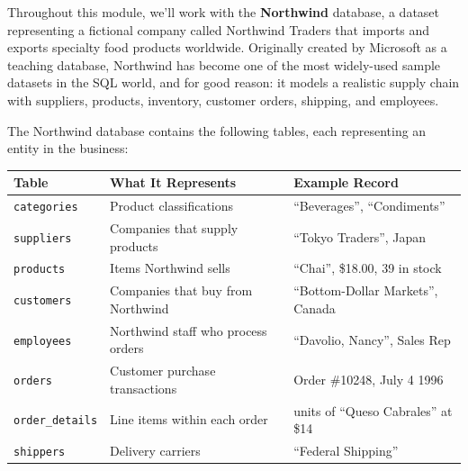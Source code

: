 \documentclass[
  letterpaper,
  DIV=11,
  numbers=noendperiod]{scrreprt}
\begin{document}
Throughout this module, we'll work with the \textbf{Northwind} database,
a dataset representing a fictional company called Northwind Traders that
imports and exports specialty food products worldwide. Originally
created by Microsoft as a teaching database, Northwind has become one of
the most widely-used sample datasets in the SQL world, and for good
reason: it models a realistic supply chain with suppliers, products,
inventory, customer orders, shipping, and employees.

The Northwind database contains the following tables, each representing
an entity in the business:

\begin{longtable}[]{@{}
  >{\raggedright\arraybackslash}p{}
  >{\raggedright\arraybackslash}p{}
  >{\raggedright\arraybackslash}p{}@{}}
\toprule\noalign{}
\begin{minipage}[b]{\linewidth}\raggedright
Table
\end{minipage} & \begin{minipage}[b]{\linewidth}\raggedright
What It Represents
\end{minipage} & \begin{minipage}[b]{\linewidth}\raggedright
Example Record
\end{minipage} \\
\midrule\noalign{}
\endhead
\bottomrule\noalign{}
\endlastfoot
\texttt{categories} & Product classifications & ``Beverages'',
``Condiments'' \\
\texttt{suppliers} & Companies that supply products & ``Tokyo Traders'',
Japan \\
\texttt{products} & Items Northwind sells & ``Chai'', \$18.00, 39 in
stock \\
\texttt{customers} & Companies that buy from Northwind & ``Bottom-Dollar
Markets'', Canada \\
\texttt{employees} & Northwind staff who process orders & ``Davolio,
Nancy'', Sales Rep \\
\texttt{orders} & Customer purchase transactions & Order \#10248, July 4
1996 \\
\texttt{order\_details} & Line items within each order & 12 units of
``Queso Cabrales'' at \$14 \\
\texttt{shippers} & Delivery carriers & ``Federal Shipping'' \\
\end{longtable}
\end{document}
